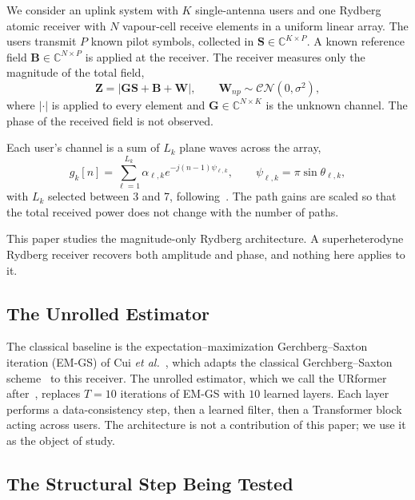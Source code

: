 \documentclass[journal]{IEEEtran}
\newcommand{\bG}{\mathbf{G}}
\newcommand{\bS}{\mathbf{S}}
\newcommand{\bB}{\mathbf{B}}
\newcommand{\bW}{\mathbf{W}}
\newcommand{\bZ}{\mathbf{Z}}
\newcommand{\CN}{\mathcal{CN}}
\begin{document}
We consider an uplink system with $K$ single-antenna users and one Rydberg
atomic receiver with $N$ vapour-cell receive elements in a uniform linear
array. The users transmit $P$ known pilot symbols, collected in
$\bS\in\mathbb{C}^{K\times P}$. A known reference field
$\bB\in\mathbb{C}^{N\times P}$ is applied at the receiver. The receiver
measures only the magnitude of the total field,
\begin{equation}
\bZ=\left|\bG\bS+\bB+\bW\right|,\qquad \bW_{np}\sim\CN(0,\sigma^2),
\label{eq:obs}
\end{equation}
where $|\cdot|$ is applied to every element and $\bG\in\mathbb{C}^{N\times K}$
is the unknown channel. The phase of the received field is not observed.

Each user's channel is a sum of $L_k$ plane waves across the array,
\begin{equation}
g_k[n]=\sum_{\ell=1}^{L_k}\alpha_{\ell,k}e^{-j(n-1)\psi_{\ell,k}},\qquad
\psi_{\ell,k}=\pi\sin\theta_{\ell,k},
\label{eq:chan}
\end{equation}
with $L_k$ selected between 3 and 7, following~\cite{xu2025}. The path gains
are scaled so that the total received power does not change with the number of
paths.

This paper studies the magnitude-only Rydberg architecture. A superheterodyne
Rydberg receiver recovers both amplitude and phase, and nothing here applies to
it.

\subsection{The Unrolled Estimator}

The classical baseline is the expectation--maximization Gerchberg--Saxton
iteration (EM-GS) of Cui \emph{et al.}~\cite[Alg.~2]{cui2025}, which adapts the
classical Gerchberg--Saxton scheme~\cite{gerchberg1972} to this receiver. The
unrolled estimator, which we call the URformer after~\cite{xiao2026}, replaces
$T=10$ iterations of EM-GS with $10$ learned layers. Each layer performs a
data-consistency step, then a learned filter, then a Transformer block acting
across users. The architecture is not a contribution of this paper; we use it
as the object of study.

\subsection{The Structural Step Being Tested}
\label{sec:model}
\end{document}
